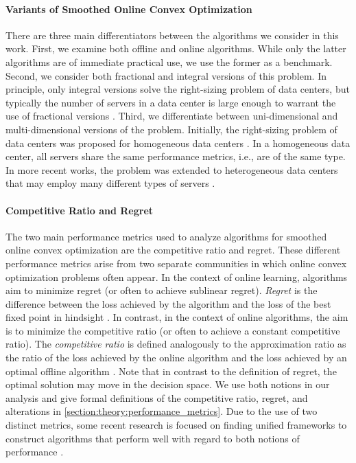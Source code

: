 \paragraph{Variants of Smoothed Online Convex Optimization} There are three main differentiators between the algorithms we consider in this work. First, we examine both offline and online algorithms. While only the latter algorithms are of immediate practical use, we use the former as a benchmark. Second, we consider both fractional and integral versions of this problem. In principle, only integral versions solve the right-sizing problem of data centers, but typically the number of servers in a data center is large enough to warrant the use of fractional versions \cite{Bansal2015}. Third, we differentiate between uni-dimensional and multi-dimensional versions of the problem. Initially, the right-sizing problem of data centers was proposed for homogeneous data centers \cite{Lin2011, Bansal2015, Albers2018}. In a homogeneous data center, all servers share the same performance metrics, i.e., are of the same type. In more recent works, the problem was extended to heterogeneous data centers that may employ many different types of servers \cite{Lin2012, Chen2018, Goel2019, Albers2021, Albers2021_2}.

\paragraph{Competitive Ratio and Regret} The two main performance metrics used to analyze algorithms for smoothed online convex optimization are the competitive ratio and regret. These different performance metrics arise from two separate communities in which online convex optimization problems often appear. In the context of online learning, algorithms aim to minimize regret (or often to achieve sublinear regret). \emph{Regret} is the difference between the loss achieved by the algorithm and the loss of the best fixed point in hindsight \cite{Chen2018}. In contrast, in the context of online algorithms, the aim is to minimize the competitive ratio (or often to achieve a constant competitive ratio). The \emph{competitive ratio} is defined analogously to the approximation ratio as the ratio of the loss achieved by the online algorithm and the loss achieved by an optimal offline algorithm \cite{Chen2018}. Note that in contrast to the definition of regret, the optimal solution may move in the decision space. We use both notions in our analysis and give formal definitions of the competitive ratio, regret, and alterations in \autoref{section:theory:performance_metrics}. Due to the use of two distinct metrics, some recent research is focused on finding unified frameworks to construct algorithms that perform well with regard to both notions of performance \cite{Chen2018, Goel2019}.

